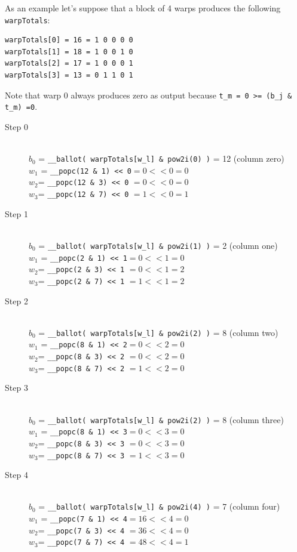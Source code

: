 As an example let’s suppose that a block of 4 warps produces the following \verb|warpTotals|:

\begin{verbatim}
warpTotals[0] = 16 = 1 0 0 0 0 
warpTotals[1] = 18 = 1 0 0 1 0
warpTotals[2] = 17 = 1 0 0 0 1
warpTotals[3] = 13 = 0 1 1 0 1
\end{verbatim}
Note that warp $0$ always produces zero as output because \verb|t_m = 0 >= (b_j & t_m) =0|.

\begin{description}
\item[Step 0]\hfill \\
	\(b_0\) = \verb|__ballot( warpTotals[w_l] & pow2i(0) )| = 12 (column zero)\\
	\(w_1\) = \verb|__popc(12 & 1) << 0|$ = 0 << 0 = 0$\\
	\(w_2\)= \verb|__popc(12 & 3) << 0| $= 0 << 0  = 0$\\
	\(w_3\)= \verb|__popc(12 & 7) << 0| $= 1 << 0  = 1$\\
	
	\item[Step 1]\hfill \\
	\(b_0\) = \verb|__ballot( warpTotals[w_l] & pow2i(1) )| = 2 (column one)\\
	\(w_1\) = \verb|__popc(2 & 1) << 1|$ = 0 << 1 = 0$\\
	\(w_2\)= \verb|__popc(2 & 3) << 1| $= 0 << 1  = 2$\\
	\(w_3\)= \verb|__popc(2 & 7) << 1| $= 1 << 1  = 2$\\
	
	
	\item[Step 2]\hfill \\
	\(b_0\) = \verb|__ballot( warpTotals[w_l] & pow2i(2) )| = 8 (column two)\\
	\(w_1\) = \verb|__popc(8 & 1) << 2|$ = 0 << 2 = 0$\\
	\(w_2\)= \verb|__popc(8 & 3) << 2| $= 0 << 2 = 0$\\
	\(w_3\)= \verb|__popc(8 & 7) << 2| $= 1 << 2  = 0$\\
	
		\item[Step 3]\hfill \\
	\(b_0\) = \verb|__ballot( warpTotals[w_l] & pow2i(2) )| = 8 (column three)\\
	\(w_1\) = \verb|__popc(8 & 1) << 3|$ = 0 << 3 = 0$\\
	\(w_2\)= \verb|__popc(8 & 3) << 3| $= 0 << 3  = 0$\\
	\(w_3\)= \verb|__popc(8 & 7) << 3| $= 1 << 3  = 0$\\
	
	
	\item[Step 4]\hfill \\
	\(b_0\) = \verb|__ballot( warpTotals[w_l] & pow2i(4) )| = 7 (column four)\\
	\(w_1\) = \verb|__popc(7 & 1) << 4|$ = 16 << 4 =0$\\
	\(w_2\)= \verb|__popc(7 & 3) << 4| $= 36 << 4 =0$\\
	\(w_3\)= \verb|__popc(7 & 7) << 4| $= 48 << 4 =1$\\
	
\end{description}

